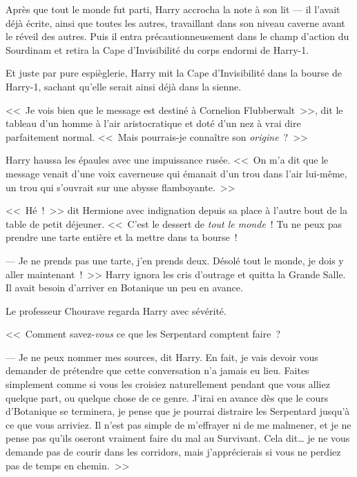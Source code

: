 Après que tout le monde fut parti, Harry accrocha la note à son lit — il l'avait déjà écrite, ainsi que toutes les autres, travaillant dans son niveau caverne avant le réveil des autres. Puis il entra précautionneusement dans le champ d'action du Sourdinam et retira la Cape d'Invisibilité du corps endormi de Harry-1.

Et juste par pure espièglerie, Harry mit la Cape d'Invisibilité dans la bourse de Harry-1, sachant qu'elle serait ainsi déjà dans la sienne.

\later

<<~Je vois bien que le message est destiné à Cornelion Flubberwalt~>>, dit le tableau d'un homme à l'air aristocratique et doté d'un nez à vrai dire parfaitement normal. <<~Mais pourrais-je connaître son \emph{origine}~?~>>

Harry haussa les épaules avec une impuissance rusée. <<~On m'a dit que le message venait d'une voix caverneuse qui émanait d'un trou dans l'air lui-même, un trou qui s'ouvrait sur une abysse flamboyante.~>>

\later

<<~Hé~!~>> dit Hermione avec indignation depuis sa place à l'autre bout de la table de petit déjeuner. <<~C'est le dessert de \emph{tout le monde}~! Tu ne peux pas prendre une tarte entière et la mettre dans ta bourse~!

--- Je ne prends pas une tarte, j'en prends deux. Désolé tout le monde, je dois y aller maintenant~!~>> Harry ignora les cris d'outrage et quitta la Grande Salle. Il avait besoin d'arriver en Botanique un peu en avance.

\later

Le professeur Chourave regarda Harry avec sévérité.

<<~Comment savez-\emph{vous} ce que les Serpentard comptent faire~?

--- Je ne peux nommer mes sources, dit Harry. En fait, je vais devoir vous demander de prétendre que cette conversation n'a jamais eu lieu. Faites simplement comme si vous les croisiez naturellement pendant que vous alliez quelque part, ou quelque chose de ce genre. J'irai en avance dès que le cours d'Botanique se terminera, je pense que je pourrai distraire les Serpentard jusqu'à ce que vous arriviez. Il n'est pas simple de m'effrayer ni de me malmener, et je ne pense pas qu'ils oseront vraiment faire du mal au Survivant. Cela dit… je ne vous demande pas de courir dans les corridors, mais j'apprécierais si vous ne perdiez pas de temps en chemin.~>>

